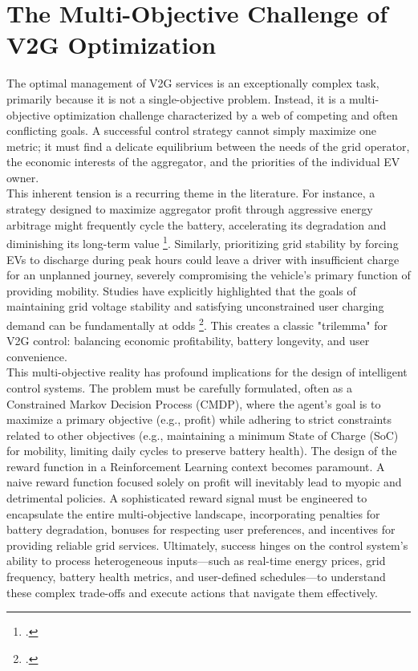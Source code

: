 \section{The Multi-Objective Challenge of V2G Optimization}
The optimal management of V2G services is an exceptionally complex task, primarily because it is not a single-objective problem. Instead, it is a multi-objective optimization challenge characterized by a web of competing and often conflicting goals. A successful control strategy cannot simply maximize one metric; it must find a delicate equilibrium between the needs of the grid operator, the economic interests of the aggregator, and the priorities of the individual EV owner.
\\
This inherent tension is a recurring theme in the literature. For instance, a strategy designed to maximize aggregator profit through aggressive energy arbitrage might frequently cycle the battery, accelerating its degradation and diminishing its long-term value \footcite{shibl2023electric}. Similarly, prioritizing grid stability by forcing EVs to discharge during peak hours could leave a driver with insufficient charge for an unplanned journey, severely compromising the vehicle's primary function of providing mobility. Studies have explicitly highlighted that the goals of maintaining grid voltage stability and satisfying unconstrained user charging demand can be fundamentally at odds \footcite{wang2023deep}. This creates a classic "trilemma" for V2G control: balancing economic profitability, battery longevity, and user convenience.
\\
This multi-objective reality has profound implications for the design of intelligent control systems. The problem must be carefully formulated, often as a Constrained Markov Decision Process (CMDP), where the agent's goal is to maximize a primary objective (e.g., profit) while adhering to strict constraints related to other objectives (e.g., maintaining a minimum State of Charge (SoC) for mobility, limiting daily cycles to preserve battery health). The design of the reward function in a Reinforcement Learning context becomes paramount. A naive reward function focused solely on profit will inevitably lead to myopic and detrimental policies. A sophisticated reward signal must be engineered to encapsulate the entire multi-objective landscape, incorporating penalties for battery degradation, bonuses for respecting user preferences, and incentives for providing reliable grid services. Ultimately, success hinges on the control system's ability to process heterogeneous inputs—such as real-time energy prices, grid frequency, battery health metrics, and user-defined schedules—to understand these complex trade-offs and execute actions that navigate them effectively.
\\
